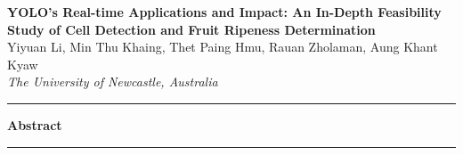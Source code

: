 \documentclass[a4paper,12pt]{article}
\renewenvironment{abstract}
 {\begin{center}
    \Large\bfseries Abstract
    \end{center}
    \begin{center}
    \begin{minipage}{0.8\textwidth}
    \small}
 {\end{minipage}
  \end{center}
  \medskip}
\begin{document}
\pagestyle{fancy}
\thispagestyle{empty}
\fancyhead[L]{}
\renewcommand*{\thefootnote}{\fnsymbol{footnote}}
\begin{center}
\Large{\textbf{YOLO's Real-time Applications and Impact: An In-Depth Feasibility Study of Cell Detection and Fruit Ripeness Determination}}
\vspace{0.4cm}
\normalsize
\\ Yiyuan Li, Min Thu Khaing, Thet Paing Hmu, Rauan Zholaman, Aung Khant Kyaw \\
\vspace{0.1cm}
\textit{The University of Newcastle, Australia}
\medskip
\normalsize
\end{center}
{\color{gray}\hrule}
\vspace{0.4cm}
\begin{abstract}

\end{abstract}
{\color{gray}\hrule}
\medskip








\end{document}
